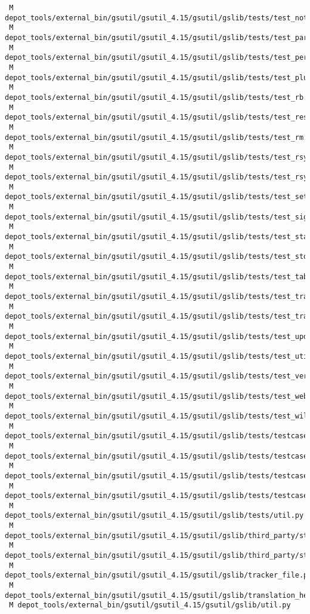 \documentclass{article}
\begin{document}
\begin{verbatim}
 M depot_tools/external_bin/gsutil/gsutil_4.15/gsutil/gslib/tests/test_notification.py
 M depot_tools/external_bin/gsutil/gsutil_4.15/gsutil/gslib/tests/test_parallelism_framework.py
 M depot_tools/external_bin/gsutil/gsutil_4.15/gsutil/gslib/tests/test_perfdiag.py
 M depot_tools/external_bin/gsutil/gsutil_4.15/gsutil/gslib/tests/test_plurality_checkable_iterator.py
 M depot_tools/external_bin/gsutil/gsutil_4.15/gsutil/gslib/tests/test_rb.py
 M depot_tools/external_bin/gsutil/gsutil_4.15/gsutil/gslib/tests/test_resumable_streaming.py
 M depot_tools/external_bin/gsutil/gsutil_4.15/gsutil/gslib/tests/test_rm.py
 M depot_tools/external_bin/gsutil/gsutil_4.15/gsutil/gslib/tests/test_rsync.py
 M depot_tools/external_bin/gsutil/gsutil_4.15/gsutil/gslib/tests/test_rsync_funcs.py
 M depot_tools/external_bin/gsutil/gsutil_4.15/gsutil/gslib/tests/test_setmeta.py
 M depot_tools/external_bin/gsutil/gsutil_4.15/gsutil/gslib/tests/test_signurl.py
 M depot_tools/external_bin/gsutil/gsutil_4.15/gsutil/gslib/tests/test_stat.py
 M depot_tools/external_bin/gsutil/gsutil_4.15/gsutil/gslib/tests/test_storage_url.py
 M depot_tools/external_bin/gsutil/gsutil_4.15/gsutil/gslib/tests/test_tabcomplete.py
 M depot_tools/external_bin/gsutil/gsutil_4.15/gsutil/gslib/tests/test_trace.py
 M depot_tools/external_bin/gsutil/gsutil_4.15/gsutil/gslib/tests/test_tracker_file.py
 M depot_tools/external_bin/gsutil/gsutil_4.15/gsutil/gslib/tests/test_update.py
 M depot_tools/external_bin/gsutil/gsutil_4.15/gsutil/gslib/tests/test_util.py
 M depot_tools/external_bin/gsutil/gsutil_4.15/gsutil/gslib/tests/test_versioning.py
 M depot_tools/external_bin/gsutil/gsutil_4.15/gsutil/gslib/tests/test_web.py
 M depot_tools/external_bin/gsutil/gsutil_4.15/gsutil/gslib/tests/test_wildcard_iterator.py
 M depot_tools/external_bin/gsutil/gsutil_4.15/gsutil/gslib/tests/testcase/__init__.py
 M depot_tools/external_bin/gsutil/gsutil_4.15/gsutil/gslib/tests/testcase/base.py
 M depot_tools/external_bin/gsutil/gsutil_4.15/gsutil/gslib/tests/testcase/integration_testcase.py
 M depot_tools/external_bin/gsutil/gsutil_4.15/gsutil/gslib/tests/testcase/unit_testcase.py
 M depot_tools/external_bin/gsutil/gsutil_4.15/gsutil/gslib/tests/util.py
 M depot_tools/external_bin/gsutil/gsutil_4.15/gsutil/gslib/third_party/storage_apitools/storage_v1_client.py
 M depot_tools/external_bin/gsutil/gsutil_4.15/gsutil/gslib/third_party/storage_apitools/storage_v1_messages.py
 M depot_tools/external_bin/gsutil/gsutil_4.15/gsutil/gslib/tracker_file.py
 M depot_tools/external_bin/gsutil/gsutil_4.15/gsutil/gslib/translation_helper.py
 M depot_tools/external_bin/gsutil/gsutil_4.15/gsutil/gslib/util.py

\end{verbatim}
\end{document}
